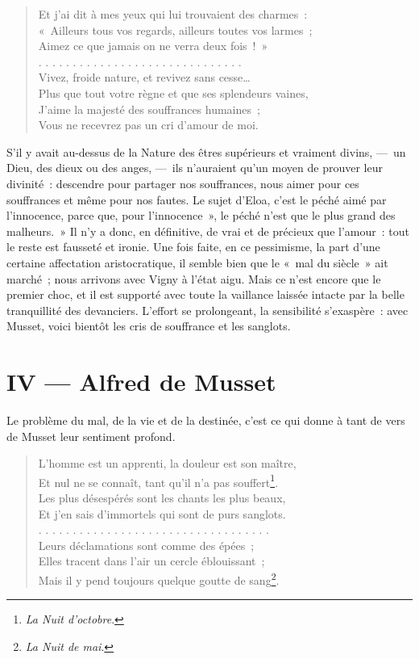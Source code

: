 \documentclass[french,twoside]{book} %
\begin{document}
\begin{verse}
Et j’ai dit à mes yeux qui lui trouvaient des charmes :\\
« Ailleurs tous vos regards, ailleurs toutes vos larmes ;\\
Aimez ce que jamais on ne verra deux fois ! »\\
. . . . . . . . . . . . . . . . . . . . . . . . . . . . . .\\
Vivez, froide nature, et revivez sans cesse…\\
Plus que tout votre règne et que ses splendeurs vaines,\\
J’aime la majesté des souffrances humaines ;\\
Vous ne recevrez pas un cri d’amour de moi.\\
\end{verse}

\noindent S’il y avait au-dessus de la Nature des êtres supérieurs et vraiment divins, — un Dieu, des dieux ou des anges, — ils n’auraient qu’un moyen de prouver leur divinité : descendre pour partager nos souffrances, nous aimer pour ces souffrances et même pour nos fautes. Le sujet d’Eloa, c’est le péché aimé par l’innocence, parce que, pour l’innocence », le péché n’est que le plus grand des malheurs. » Il n’y a donc, en définitive, de vrai et de précieux que l’amour : tout le reste est fausseté et ironie. Une fois faite, en ce pessimisme, la part d’une certaine affectation aristocratique, il semble bien que le « mal du siècle » ait marché ; nous arrivons avec Vigny à l’état aigu. Mais ce n’est encore que le premier choc, et il est supporté avec toute la vaillance laissée intacte par la belle tranquillité des devanciers. L’effort se prolongeant, la sensibilité s’exaspère : avec Musset, voici bientôt les cris de souffrance et les sanglots.
\section[{IV — Alfred de Musset}]{IV — Alfred de Musset}
\noindent Le problème du mal, de la vie et de la destinée, c’est ce qui donne à tant de vers de Musset leur sentiment profond.\par


\begin{verse}
L’homme est un apprenti, la douleur est son maître,\\
Et nul ne se connaît, tant qu’il n’a pas souffert\footnote{\emph{La Nuit d’octobre}.}.\\
Les plus désespérés sont les chants les plus beaux,\\
Et j’en sais d’immortels qui sont de purs sanglots.\\
. . . . . . . . . . . . . . . . . . . . . . . . . . . . . . . . . .\\
Leurs déclamations sont comme des épées ;\\
Elles tracent dans l’air un cercle éblouissant ;\\
Mais il y pend toujours quelque goutte de sang\footnote{\emph{La Nuit de mai}.}.\\
\end{verse}
\end{document}
